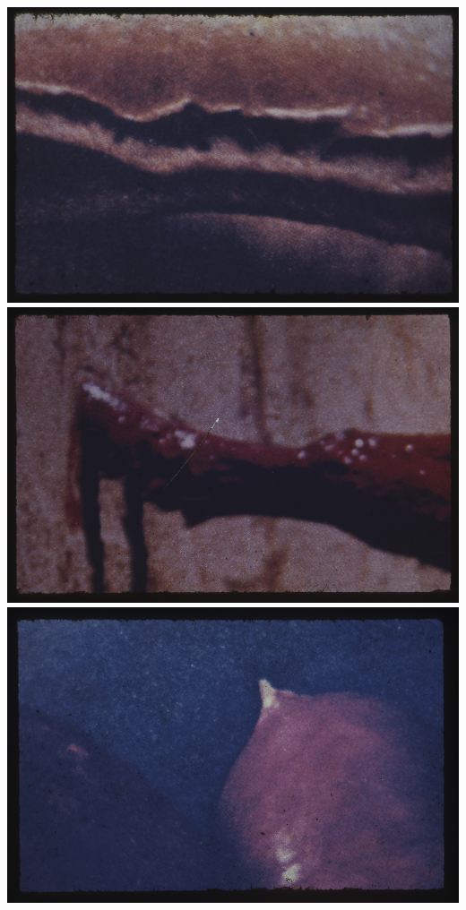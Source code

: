 \includegraphics[width=\columnwidth]{media/IMAGEM32.jpg}
\includegraphics[width=\columnwidth]{media/IMAGEM33.jpg}
\includegraphics[width=\columnwidth]{media/IMAGEM34.jpg}
